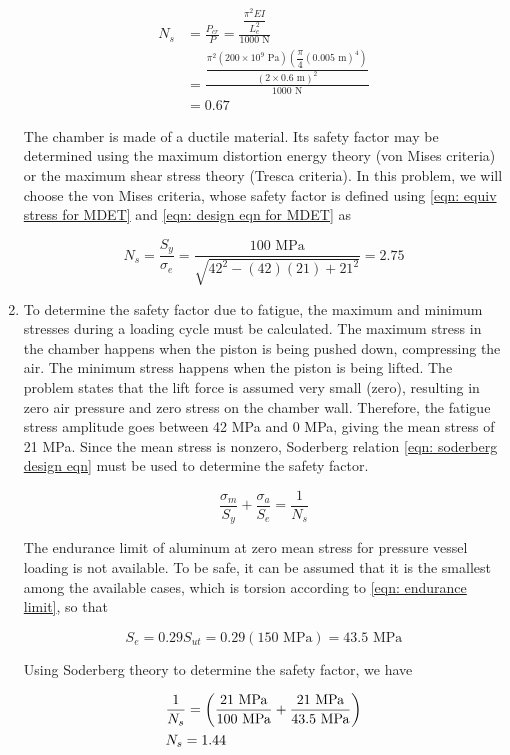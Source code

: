 \documentclass[
10pt,
a4paper,
openany,
svgnames,
]{book}
\begin{document}
\begin{enumerate}
\begin{align*}
  N_s &= \frac{P_{cr}}{P} = \frac{\dfrac{\pi ^2 EI}{L_e^2}}{1000\text{ N}} \\[0.5em] 
      &= \frac{\dfrac{\pi ^2 (200 \times 10^9 \text{ Pa}) \left( \dfrac{\pi }{4}(0.005\text{ m})^4 \right)}{(2 \times 0.6\text{ m})^2}}{1000\text{ N}} \\[0.5em] 
      &= 0.67
\end{align*}

The chamber is made of a ductile material. Its safety factor may be determined using the maximum distortion energy theory (von Mises criteria) or the maximum shear stress theory (Tresca criteria). In this problem, we will choose the von Mises criteria, whose safety factor is defined using \cref{eqn: equiv stress for MDET} and \cref{eqn: design eqn for MDET} as

\[N_s = \frac{S_y}{\sigma_e} = \frac{100\text{ MPa}}{\sqrt {42^2 - (42)(21) + 21^2}} = 2.75\]

\item To determine the safety factor due to fatigue, the maximum and minimum stresses during a loading cycle must be calculated. The maximum stress in the chamber happens when the piston is being pushed down, compressing the air. The minimum stress happens when the piston is being lifted. The problem states that the lift force is assumed very small (zero), resulting in zero air pressure and zero stress on the chamber wall. Therefore, the fatigue stress amplitude goes between 42 MPa and 0 MPa, giving the mean stress of 21 MPa. Since the mean stress is nonzero, Soderberg relation \cref{eqn: soderberg design eqn} must be used to determine the safety factor.
  
  \[\frac{\sigma _m}{S_y} + \frac{\sigma _a}{S_e} = \frac{1}{N_s}\]
  
  The endurance limit of aluminum at zero mean stress for pressure vessel loading is not available. To be safe, it can be assumed that it is the smallest among the available cases, which is torsion according to \cref{eqn: endurance limit}, so that
  
  \[S_e = 0.29S _{ut} = 0.29(150\text{ MPa}) = 43.5\text{ MPa}\]
  
  Using Soderberg theory to determine the safety factor, we have
  
  \[\begin{gathered}
      \frac{1}{N_s} = \left( \frac{21\text{ MPa}}{100\text{ MPa}} + \frac{21\text{ MPa}}{43.5\text{ MPa}} \right) \hfill \\
      N_s = 1.44 \hfill \\ 
    \end{gathered} \]
\end{enumerate}
\end{document}
